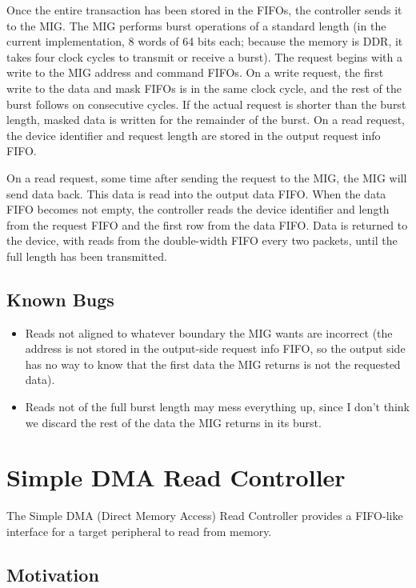 \documentclass[10pt]{article}
\begin{document}
Once the entire transaction has been stored in the FIFOs, the controller
sends it to the MIG. The MIG performs burst operations of a standard length
(in the current implementation, 8 words of 64 bits each; because the memory
is DDR, it takes four clock cycles to transmit or receive a burst). The
request begins with a write to the MIG address and command FIFOs. On a write
request, the first write to the data and mask FIFOs is in the same clock
cycle, and the rest of the burst follows on consecutive cycles. If the
actual request is shorter than the burst length, masked data is written for
the remainder of the burst. On a read request, the device identifier and
request length are stored in the output request info FIFO.

On a read request, some time after sending the request to the MIG, the MIG
will send data back. This data is read into the output data FIFO. When the
data FIFO becomes not empty, the controller reads the device identifier and
length from the request FIFO and the first row from the data FIFO. Data is
returned to the device, with reads from the double-width FIFO every two
packets, until the full length has been transmitted.

\subsection{Known Bugs}

\begin{itemize}
\item{Reads not aligned to whatever boundary the MIG wants are incorrect
(the address is not stored in the output-side request info FIFO, so the
output side has no way to know that the first data the MIG returns is not
the requested data).}
\item{Reads not of the full burst length may mess everything up, since I
don't think we discard the rest of the data the MIG returns in its burst.}
\end{itemize}

\section{Simple DMA Read Controller}
\label{sec:dmac}

The Simple DMA (Direct Memory Access) Read Controller provides a FIFO-like
interface for a target peripheral to read from memory.

\subsection{Motivation}
\end{document}

